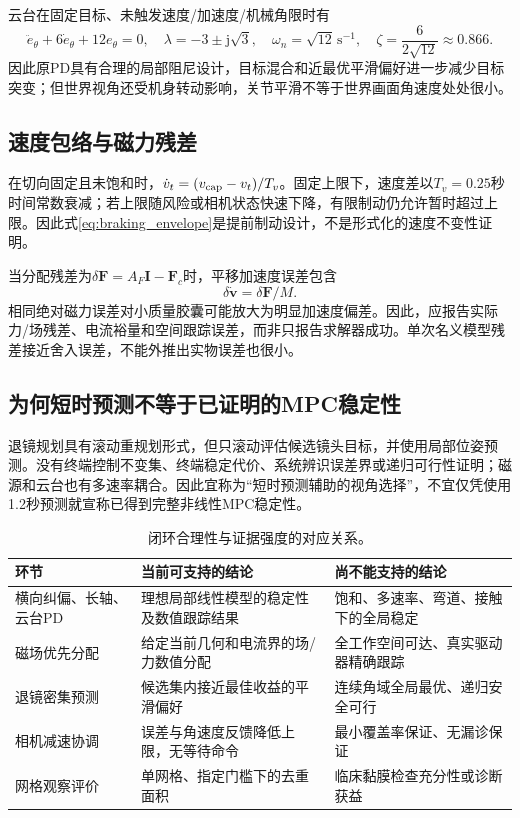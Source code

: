 \documentclass[UTF8,a4paper,zihao=5,fontset=windows]{ctexart}
\newcommand{\vect}[1]{\bm{#1}}
\newcommand{\unit}[1]{\,\mathrm{#1}}
\begin{document}
云台在固定目标、未触发速度/加速度/机械角限时有
\begin{equation}
\ddot e_\theta+6\dot e_\theta+12e_\theta=0,\quad
\lambda=-3\pm\mathrm j\sqrt3,\quad\omega_n=\sqrt{12}\unit{s^{-1}},\quad\zeta=\frac6{2\sqrt{12}}\approx0.866.
\label{eq:gimbal_stability}
\end{equation}
因此原PD具有合理的局部阻尼设计，目标混合和近最优平滑偏好进一步减少目标突变；但世界视角还受机身转动影响，关节平滑不等于世界画面角速度处处很小。

\subsection{速度包络与磁力残差}
在切向固定且未饱和时，$\dot v_t=(v_{\rm cap}-v_t)/T_v$。固定上限下，速度差以$T_v=0.25$秒时间常数衰减；若上限随风险或相机状态快速下降，有限制动仍允许暂时超过上限。因此式\eqref{eq:braking_envelope}是提前制动设计，不是形式化的速度不变性证明。

当分配残差为$\delta\vect F=A_F\vect I-\vect F_c$时，平移加速度误差包含
\begin{equation}
\delta\dot{\vect v}=\delta\vect F/M.
\label{eq:force_residual}
\end{equation}
相同绝对磁力误差对小质量胶囊可能放大为明显加速度偏差。因此，应报告实际力/场残差、电流裕量和空间跟踪误差，而非只报告求解器成功。单次名义模型残差接近舍入误差，不能外推出实物误差也很小。

\subsection{为何短时预测不等于已证明的MPC稳定性}
退镜规划具有滚动重规划形式，但只滚动评估候选镜头目标，并使用局部位姿预测。没有终端控制不变集、终端稳定代价、系统辨识误差界或递归可行性证明；磁源和云台也有多速率耦合。因此宜称为“短时预测辅助的视角选择”，不宜仅凭使用1.2秒预测就宣称已得到完整非线性MPC稳定性。

\begin{table}[htbp]
\centering\small\caption{闭环合理性与证据强度的对应关系。}
\begin{tabularx}{\linewidth}{p{.20\linewidth}XX}
\toprule 环节 & 当前可支持的结论 & 尚不能支持的结论\\\midrule
横向纠偏、长轴、云台PD & 理想局部线性模型的稳定性及数值跟踪结果 & 饱和、多速率、弯道、接触下的全局稳定\\
磁场优先分配 & 给定当前几何和电流界的场/力数值分配 & 全工作空间可达、真实驱动器精确跟踪\\
退镜密集预测 & 候选集内接近最佳收益的平滑偏好 & 连续角域全局最优、递归安全可行\\
相机减速协调 & 误差与角速度反馈降低上限，无等待命令 & 最小覆盖率保证、无漏诊保证\\
网格观察评价 & 单网格、指定门槛下的去重面积 & 临床黏膜检查充分性或诊断获益\\
\bottomrule\end{tabularx}
\end{table}
\end{document}
